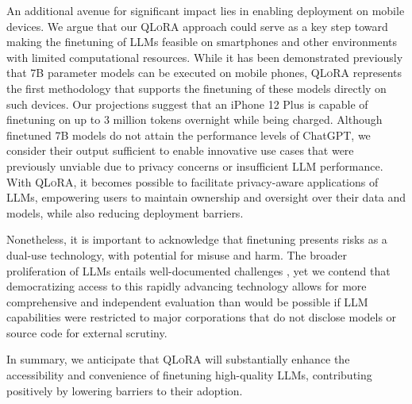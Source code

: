 An additional avenue for significant impact lies in enabling deployment on mobile devices. We argue that our \textsc{QLoRA} approach could serve as a key step toward making the finetuning of LLMs feasible on smartphones and other environments with limited computational resources. While it has been demonstrated previously that 7B parameter models can be executed on mobile phones, \textsc{QLoRA} represents the first methodology that supports the finetuning of these models directly on such devices. Our projections suggest that an iPhone 12 Plus is capable of finetuning on up to 3 million tokens overnight while being charged. Although finetuned 7B models do not attain the performance levels of ChatGPT, we consider their output sufficient to enable innovative use cases that were previously unviable due to privacy concerns or insufficient LLM performance. With \textsc{QLoRA}, it becomes possible to facilitate privacy-aware applications of LLMs, empowering users to maintain ownership and oversight over their data and models, while also reducing deployment barriers.

Nonetheless, it is important to acknowledge that finetuning presents risks as a dual-use technology, with potential for misuse and harm. The broader proliferation of LLMs entails well-documented challenges \citep{bommasani2021opportunities,bender2021dangers}, yet we contend that democratizing access to this rapidly advancing technology allows for more comprehensive and independent evaluation than would be possible if LLM capabilities were restricted to major corporations that do not disclose models or source code for external scrutiny.

In summary, we anticipate that \textsc{QLoRA} will substantially enhance the accessibility and convenience of finetuning high-quality LLMs, contributing positively by lowering barriers to their adoption.